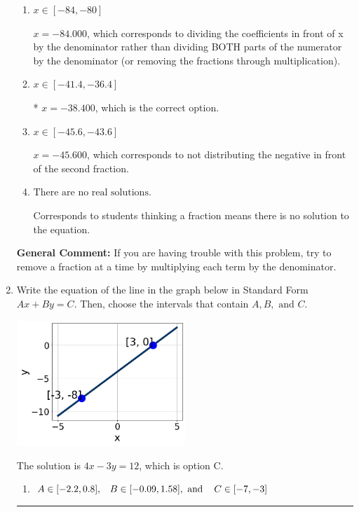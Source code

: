 \documentclass{extbook}[14pt]
\newcommand{\litem}[1]{\item #1

\rule{\textwidth}{0.4pt}}
\begin{document}
\begin{enumerate}
{\begin{enumerate}[label=\Alph*.]
 $x = -0.571$, which corresponds to dividing the second number in the numerator by the denominator rather than dividing BOTH parts of the numerator by the denominator (or removing the fractions through multiplication).
\item \( x \in [-84, -80] \)

 $x = -84.000$, which corresponds to dividing the coefficients in front of x by the denominator rather than dividing BOTH parts of the numerator by the denominator (or removing the fractions through multiplication).
\item \( x \in [-41.4, -36.4] \)

* $x = -38.400$, which is the correct option.
\item \( x \in [-45.6, -43.6] \)

 $x = -45.600$, which corresponds to not distributing the negative in front of the second fraction.
\item \( \text{There are no real solutions.} \)

Corresponds to students thinking a fraction means there is no solution to the equation.
\end{enumerate}

\textbf{General Comment:} If you are having trouble with this problem, try to remove a fraction at a time by multiplying each term by the denominator.
}
\litem{
Write the equation of the line in the graph below in Standard Form $Ax+By=C$. Then, choose the intervals that contain $A, B, \text{ and } C$.

\begin{center}
    \includegraphics[width=0.5\textwidth]{../Figures/linearGraphToStandardCopyA.png}
\end{center}


The solution is \( 4x - 3y = 12 \), which is option C.\begin{enumerate}[label=\Alph*.]
\item \( A \in [-2.2, 0.8], \hspace{3mm} B \in [-0.09, 1.58], \text{ and } \hspace{3mm} C \in [-7, -3] \)


\end{enumerate}}
\end{enumerate}
\end{document}
